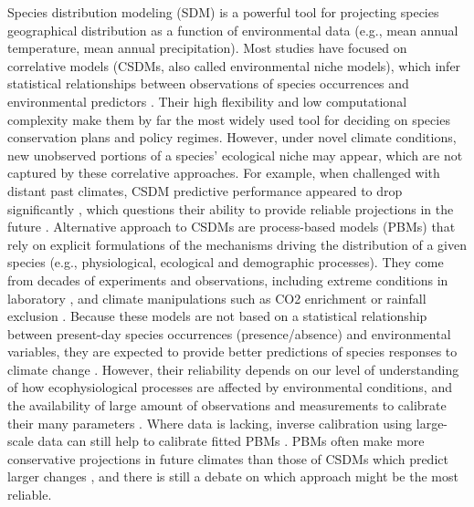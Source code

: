 \documentclass[pdflatex, sn-nature]{sn-jnl}%
\begin{document}
Species distribution modeling (SDM) is a powerful tool for projecting species geographical distribution as a function of environmental data (e.g., mean annual temperature, mean annual precipitation). Most studies have focused on correlative models (CSDMs, also called environmental niche models), which infer statistical relationships between observations of species occurrences and environmental predictors \cite{Dormann2012}. Their high flexibility and low computational complexity make them by far the most widely used tool for deciding on species conservation plans and policy regimes. However, under novel climate conditions, new unobserved portions of a species’ ecological niche may appear, which are not captured by these correlative approaches. For example, when challenged with distant past climates, CSDM predictive performance appeared to drop significantly \cite{Maguire2016}, which questions their ability to provide reliable projections in the future \cite{Fitzpatrick2018}. Alternative approach to CSDMs are process-based models (PBMs) that rely on explicit formulations of the mechanisms driving the distribution of a given species (e.g., physiological, ecological and demographic processes). They come from decades of experiments and observations, including extreme conditions in laboratory \cite{Seehausen2017}, and climate manipulations such as CO2 enrichment \cite{Jiang2020} or rainfall exclusion \cite{Gavinet2019}. Because these models are not based on a statistical relationship between present-day species occurrences (presence/absence) and environmental variables, they are expected to provide better predictions of species responses to climate change  \cite{Evans2012, Singer2016}. However, their reliability depends on our level of understanding of how ecophysiological processes are affected by environmental conditions, and the availability of large amount of observations and measurements to calibrate their many parameters  \cite{Evans2016}. Where data is lacking, inverse calibration using large-scale data can still help to calibrate fitted PBMs \cite{Dormann2012, VanderMeersch2023}. PBMs often make more conservative projections in future climates than those of CSDMs which predict larger changes \cite{Morin2009, Cheaib2012, Gritti2013}, and there is still a debate on which approach might be the most reliable.
\end{document}
